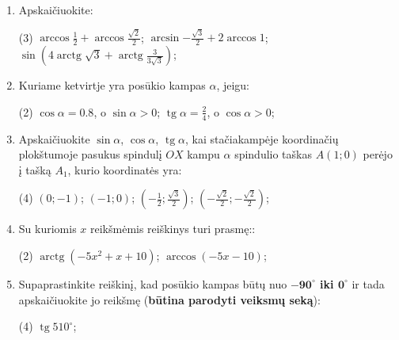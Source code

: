 \documentclass[a4paper]{article}
\DeclareMathOperator{\tg}{tg}
\DeclareMathOperator{\arctg}{arctg}
\begin{document}
\begin{enumerate}
      \item Apskaičiuokite:

            \begin{tasks}[item-format={\normalfont}, after-item-skip=4mm](3)
                  \task $\arccos{\frac{1}{2}} + \arccos{\frac{\sqrt{2}}{2}} $;
                  \task $\arcsin{-\frac{\sqrt{3}}{2}} + 2\arccos{1} $;
                  \task $\sin({4\arctg{\sqrt{3}} +
                              \arctg{\frac{3}{3\sqrt{3}}}})  $;

            \end{tasks}

      \item Kuriame ketvirtje yra posūkio kampas $\alpha$, jeigu:
            \begin{tasks}[item-format={\normalfont}, after-item-skip=4mm](2)
                  \task $\cos \alpha = 0.8$, o $\sin \alpha > 0$;
                  \task $\tg \alpha = \frac{2}{4}$, o $\cos \alpha > 0$;
            \end{tasks}
      \item Apskaičiuokite $\sin \alpha$, $\cos \alpha$, $\tg \alpha$, kai
            stačiakampėje koordinačių plokštumoje pasukus spindulį $OX$ kampu
            $\alpha$ spindulio taškas $A(1; 0)$ perėjo į tašką $A_{1}$, kurio
            koordinatės
            yra:
            \begin{tasks}[item-format={\normalfont}, after-item-skip=4mm](4)
                  \task $(0; -1)$;
                  \task $(-1; 0)$;
                  \task $(-\frac{1}{2}; \frac{\sqrt{3}}{2})$;
                  \task $(-\frac{\sqrt{2}}{2}; -\frac{\sqrt{2}}{2})$;
            \end{tasks}

      \item Su kuriomis $x$ reikšmėmis reiškinys turi prasmę::
            \begin{tasks}[item-format={\normalfont},
                        after-item-skip=4mm](2)
                  \task $\arctg(-5x^2+x+10)$;
                  \task $\arccos(-5x-10)$;
            \end{tasks}

      \item Supaprastinkite reiškinį, kad posūkio kampas būtų nuo
            \textbf{$\boldsymbol{-90^\circ}$
                  iki  $\boldsymbol{0^\circ}$} ir tada apskaičiuokite jo
            reikšmę
            (\textbf{būtina parodyti veiksmų seką}):
            \begin{tasks}[item-format={\normalfont},
                        after-item-skip=4mm](4)
                  \task $\tg 510^\circ$;


\end{tasks}
\end{enumerate}
\end{document}
